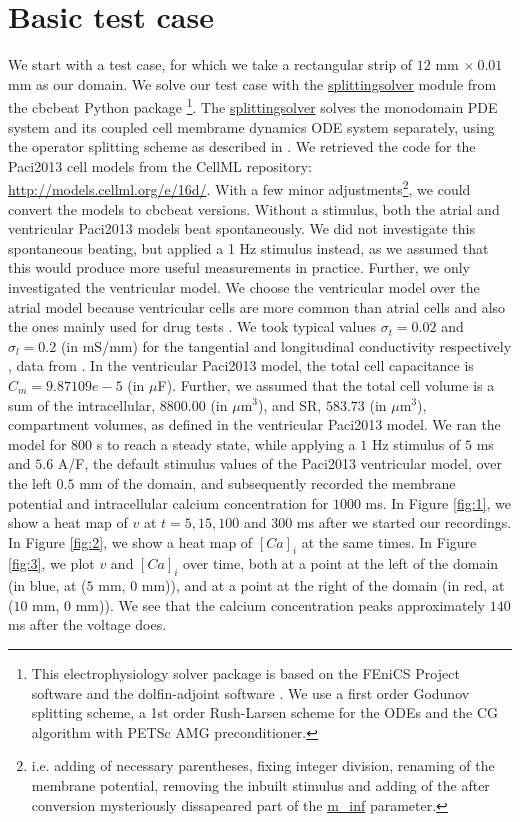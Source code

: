 \documentclass[12pt,a4paper]{article}
\begin{document}
\section{Basic test case} \label{Basic test case}
We start with a test case, for which we take a rectangular strip of $12$ mm $\times\: 0.01$ mm as our domain. We solve our test case with the \url{splittingsolver} module from the cbcbeat Python package \cite{cbcbeat}\footnote{This electrophysiology solver package is based on the FEniCS Project software \cite{fenics} and the dolfin-adjoint software \cite{dolfin-adjoint}. We use a first order Godunov splitting scheme, a 1st order Rush-Larsen scheme for the ODEs and the CG algorithm with PETSc AMG preconditioner.}. The \url{splittingsolver} solves the monodomain PDE system and its coupled cell membrame dynamics ODE system separately, using the operator splitting scheme as described in \cite{Sundnes}. We retrieved the code for the Paci2013 cell models from the CellML repository: \url{http://models.cellml.org/e/16d/}. With a few minor adjustments\footnote{i.e. adding of necessary parentheses, fixing integer division, renaming of the membrane potential, removing the inbuilt stimulus and adding of the after conversion mysteriously dissapeared part of the \url{m_inf} parameter.}, we could convert the models to cbcbeat versions. Without a stimulus, both the atrial and ventricular Paci2013 models beat spontaneously. We did not investigate this spontaneous beating, but applied a 1 Hz stimulus instead, as we assumed that this would produce more useful measurements in practice. Further, we only investigated the ventricular model. We choose the ventricular model over the atrial model because ventricular cells are more common than atrial cells and also the ones mainly used for drug tests \cite{Paci2015}. We took typical values $\sigma_t=0.02$ and $\sigma_l=0.2$ (in mS/mm) for the tangential and longitudinal conductivity respectively \cite{Roth}, data from \cite{Plonsey1882, Plonsey1984}. In the ventricular Paci2013 model, the total cell capacitance is $C_m=9.87109e-5$ (in $\mu$F). Further, we assumed that the total cell volume is a sum of the intracellular, $8800.00$ (in $\mu$m$^3$), and SR, $583.73$ (in $\mu$m$^3$), compartment volumes, as defined in the ventricular Paci2013 model.
We ran the model for 800 s to reach a steady state, while applying a $1$ Hz stimulus of $5$ ms and $5.6$ A/F, the default stimulus values of the Paci2013 ventricular model, over the left $0.5$ mm of the domain, and subsequently recorded the membrane potential and intracellular calcium concentration for $1000$ ms. In Figure \ref{fig:1}, we show a heat map of $v$ at $t=5, 15, 100$ and $300$ ms after we started our recordings. In Figure \ref{fig:2}, we show a heat map of $[Ca]_i$ at the same times. In Figure \ref{fig:3}, we plot $v$ and $[Ca]_i$ over time, both at a point at the left of the domain (in blue, at ($5$ mm, $0$ mm)), and at a point at the right of the domain (in red, at ($10$ mm, $0$ mm)). We see that the calcium concentration peaks approximately $140$ ms after the voltage does. 
\end{document}
